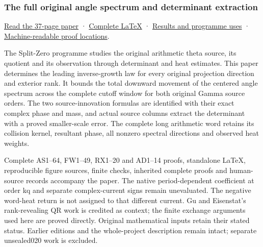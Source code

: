 \documentclass[
]{article}
\begin{document}
\subsubsection{The full original angle spectrum and determinant
extraction}\label{the-full-original-angle-spectrum-and-determinant-extraction}

\href{https://github.com/KokunoYumeto/zeta-function-research-reader/blob/main/workbenches/splitzero-tandem/continuations/20260921-original-angle-word/ORIGINAL_ANGLE_WORD_READER.pdf}{Read
the 37-page paper} ·
\href{https://github.com/KokunoYumeto/zeta-function-research-reader/blob/main/workbenches/splitzero-tandem/continuations/20260921-original-angle-word/ORIGINAL_ANGLE_WORD_READER.tex}{Complete
LaTeX} ·
\href{https://github.com/KokunoYumeto/zeta-function-research-reader/blob/main/workbenches/splitzero-tandem/continuations/20260921-original-angle-word/RESULTS_20260921_019.md}{Results
and programme uses} ·
\href{https://github.com/KokunoYumeto/zeta-function-research-reader/blob/main/workbenches/splitzero-tandem/continuations/20260921-original-angle-word/RESULT_INDEX.json}{Machine-readable
proof locations}.

The Split-Zero programme studies the original arithmetic theta source,
its quotient and its observation through determinant and heat estimates.
This paper determines the leading inverse-growth law for every original
projection direction and exterior rank. It bounds the total downward
movement of the centered angle spectrum across the complete cutoff
window for both original Gamma source orders. The two source-innovation
formulas are identified with their exact complex phase and mass, and
actual source columns extract the determinant with a proved
smaller-scale error. The complete long arithmetic word retains its
collision kernel, resultant phase, all nonzero spectral directions and
observed heat weights.

Complete AS1--64, FW1--49, RX1--20 and AD1--14 proofs, standalone LaTeX,
reproducible figure sources, finite checks, inherited complete proofs
and human-source records accompany the paper. The native
period-dependent coefficient at order kq and separate complex-current
signs remain unevaluated. The negative word-heat return is not assigned
to that different current. Gu and Eisenstat's rank-revealing QR work is
credited as context; the finite exchange arguments used here are proved
directly. Original mathematical inputs retain their stated status.
Earlier editions and the whole-project description remain intact;
separate unsealed020 work is excluded.
\end{document}
